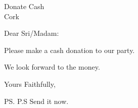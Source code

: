 \documentclass{letter}
\begin{document}
	\begin{letter}{Donate Cash\\Cork}
		\opening{Dear Sri/Madam:} 

		Please make a cash donation to our party.

		We look forward to the money.

		\closing{Yours Faithfully,}
		\ps{P.S Send it now.}
	\end{letter}
\end{document}
